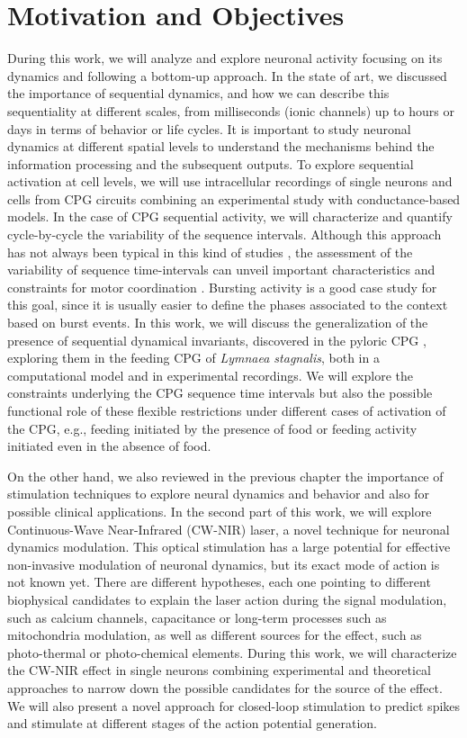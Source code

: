 \chapter{Motivation and Objectives}\label{c-review}
During this work, we will analyze and explore neuronal activity focusing on its dynamics and following a bottom-up approach. In the state of art, we discussed the importance of sequential dynamics, and how we can describe this sequentiality at different scales, from milliseconds (ionic channels) up to hours or days in terms of behavior or life cycles. It is important to study neuronal dynamics at different spatial levels to understand the mechanisms behind the information processing and the subsequent outputs. To explore sequential activation at cell levels, we will use intracellular recordings of single neurons and cells from CPG circuits combining an experimental study with conductance-based models. In the case of CPG sequential activity, we will characterize and quantify cycle-by-cycle the variability of the sequence intervals. Although this approach has not always been typical in this kind of studies \parencite{anwar_interanimal_2022}, the assessment of the variability of sequence time-intervals can unveil important characteristics and constraints for motor coordination \parencite{elices_robust_2019}. Bursting activity is a good case study for this goal, since it is usually easier to define the phases associated to the context based on burst events. In this work, we will discuss the generalization of the presence of sequential dynamical invariants, discovered in the pyloric CPG \parencite{elices_robust_2019}, exploring them in the feeding CPG of \textit{Lymnaea stagnalis}, both in a computational model and in experimental recordings. We will explore the constraints underlying the CPG sequence time intervals but also the possible functional role of these flexible restrictions under different cases of activation of the CPG, e.g., feeding initiated by the presence of food or feeding activity initiated even in the absence of food. 

On the other hand, we also reviewed in the previous chapter the importance of stimulation techniques to explore neural dynamics and behavior and also for possible clinical applications. In the second part of this work, we will explore Continuous-Wave Near-Infrared (CW-NIR) laser, a novel technique for neuronal dynamics modulation. This optical stimulation has a 
 large potential for effective non-invasive modulation of neuronal dynamics, but its exact mode of action is not known yet. There are different hypotheses, each one pointing to different biophysical candidates to explain the laser action  during the signal modulation, such as calcium channels, capacitance or long-term processes such as mitochondria modulation, as well as different sources for the effect, such as photo-thermal or photo-chemical elements. During this work, we will characterize the CW-NIR effect in single neurons combining experimental and theoretical approaches to narrow down the possible candidates for the source of the effect. We will also present a novel approach for closed-loop stimulation to predict spikes and stimulate at different stages of the action potential generation. 

